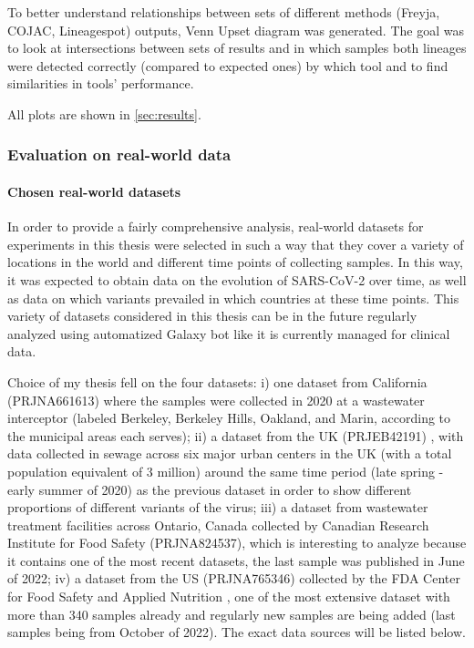                 To better understand relationships between sets of different methods (Freyja, COJAC, Lineagespot) outputs, Venn Upset diagram was generated. The goal was to look at intersections between sets of results and in which samples both lineages were detected correctly (compared to expected ones) by which tool and to find similarities in tools' performance.
                
                All plots are shown in \cref{sec:results}.

        
        \subsubsection{Evaluation on real-world data} \label{sec:methods:evaluation:real}
        
            \paragraph{Chosen real-world datasets} 
            In order to provide a fairly comprehensive analysis, real-world datasets for experiments in this thesis were selected in such a way that they cover a variety of locations in the world and different time points of collecting samples. In this way, it was expected to obtain data on the evolution of SARS-CoV-2 over time, as well as data on which variants prevailed in which countries at these time points. This variety of datasets considered in this thesis can be in the future regularly analyzed using automatized Galaxy bot like it is currently managed for clinical data. 

            Choice of my thesis fell on the four datasets: i) one dataset from California (PRJNA661613)\cite{critschristoph} where the samples were collected in 2020 at a wastewater interceptor (labeled Berkeley, Berkeley Hills, Oakland, and Marin, according to the municipal areas each serves); ii) a dataset from the UK (PRJEB42191) \cite{hillary2021}, with data collected in sewage across six major urban centers in the UK (with a total population equivalent of 3 million) around the same time period (late spring - early summer of 2020) as the previous dataset  in order to show different proportions of different variants of the virus; iii) a dataset from wastewater treatment facilities across Ontario, Canada collected by Canadian Research Institute for Food Safety (PRJNA824537), which is interesting to analyze because it contains  one of the most recent datasets, the last sample was published in June of 2022; iv) a dataset from the US (PRJNA765346) collected by the FDA Center for Food Safety and Applied Nutrition \cite{nutrition2022}, one of the most extensive dataset with more than 340 samples already and regularly new samples are being added (last samples being from October of 2022). The exact data sources will be listed below.
            
